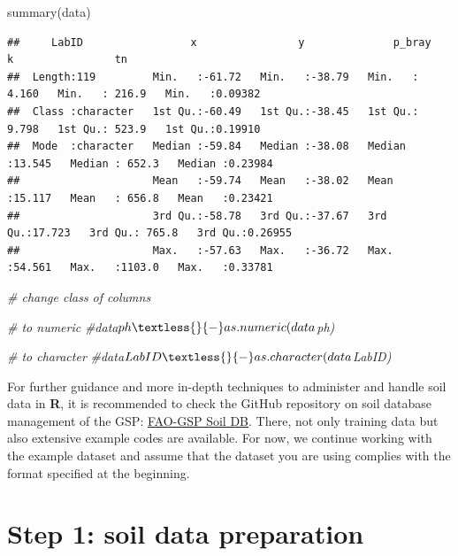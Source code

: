 \documentclass[
  10pt,
  b5paper,
  oneside]{book}
\newenvironment{Shaded}{\begin{snugshade}}{\end{snugshade}}
\newcommand{\CommentTok}[1]{\textcolor[rgb]{0.56,0.35,0.01}{\textit{#1}}}
\newcommand{\FunctionTok}[1]{\textcolor[rgb]{0.00,0.00,0.00}{#1}}
\newcommand{\NormalTok}[1]{#1}
\begin{document}
\begin{Shaded}
\begin{Highlighting}[]
\FunctionTok{summary}\NormalTok{(data)}
\end{Highlighting}
\end{Shaded}

\begin{verbatim}
##     LabID                 x                y              p_bray             k                tn         
##  Length:119         Min.   :-61.72   Min.   :-38.79   Min.   : 4.160   Min.   : 216.9   Min.   :0.09382  
##  Class :character   1st Qu.:-60.49   1st Qu.:-38.45   1st Qu.: 9.798   1st Qu.: 523.9   1st Qu.:0.19910  
##  Mode  :character   Median :-59.84   Median :-38.08   Median :13.545   Median : 652.3   Median :0.23984  
##                     Mean   :-59.74   Mean   :-38.02   Mean   :15.117   Mean   : 656.8   Mean   :0.23421  
##                     3rd Qu.:-58.78   3rd Qu.:-37.67   3rd Qu.:17.723   3rd Qu.: 765.8   3rd Qu.:0.26955  
##                     Max.   :-57.63   Max.   :-36.72   Max.   :54.561   Max.   :1103.0   Max.   :0.33781
\end{verbatim}

\begin{Shaded}
\begin{Highlighting}[]
\CommentTok{\# change class of columns}

\CommentTok{\# to numeric}
\CommentTok{\#data$ph \textless{}{-} as.numeric(data$ph)}

\CommentTok{\# to character}
\CommentTok{\#data$LabID \textless{}{-} as.character(data$LabID)}
\end{Highlighting}
\end{Shaded}

For further guidance and more in-depth techniques to administer and handle soil data in \textbf{R}, it is recommended to check the GitHub repository on soil database management of the GSP: \href{https://github.com/FAO-GSP/SoilDB}{FAO-GSP Soil DB}. There, not only training data but also extensive example codes are available.
For now, we continue working with the example dataset and assume that the dataset you are using complies with the format specified at the beginning.

\hypertarget{step-1-soil-data-preparation}{%
\chapter{Step 1: soil data preparation}\label{step-1-soil-data-preparation}}
\end{document}
